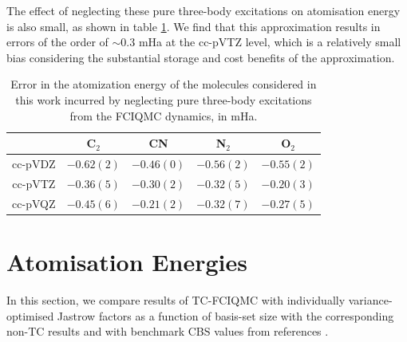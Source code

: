 The effect of neglecting these pure three-body excitations on atomisation energy is also small, as shown in table \ref{table:no3_Eat_error}. We find that this approximation results in errors of the order of
$\sim0.3$ mHa at the cc-pVTZ level, which is a relatively small bias
considering the substantial storage and cost benefits of the
approximation.

\begin{table}[htbp]
    \centering
    \begin{tabular}{cllll}
                              &
    \multicolumn{1}{c}{C$_2$} &
    \multicolumn{1}{c}{CN   } &
    \multicolumn{1}{c}{N$_2$} &
    \multicolumn{1}{c}{O$_2$} \\
    \hline \hline
    cc-pVDZ   & $-0.62(2)$ & $-0.46(0)$ & $-0.56(2)$ & $-0.55(2)$ \\
    cc-pVTZ   & $-0.36(5)$ & $-0.30(2)$ & $-0.32(5)$ & $-0.20(3)$ \\
    cc-pVQZ   & $-0.45(6)$ & $-0.21(2)$ & $-0.32(7)$ & $-0.27(5)$ \\
    \hline
    \end{tabular}
    \caption{
      Error in the atomization energy of the molecules considered in this
      work incurred by neglecting pure three-body excitations from the
      FCIQMC dynamics, in mHa.
      \label{table:no3_Eat_error}}
  \end{table}

\section{Atomisation Energies}

In this section, we compare results of TC-FCIQMC with individually variance-optimised Jastrow factors as a function of basis-set size with the corresponding non-TC results and with benchmark \gls{CBS} values from references \parencite{fellerSurvey2008,bytautasCorrelation2005,hardingHighaccuracy2008}.

